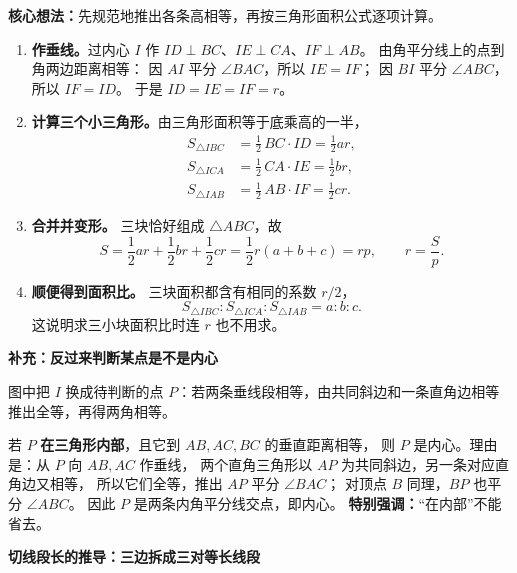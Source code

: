 \begin{proofbox}
\begin{minipage}{\linewidth}
\end{minipage}\par
\textbf{核心想法：}先规范地推出各条高相等，再按三角形面积公式逐项计算。
\begin{enumerate}[leftmargin=*,itemsep=0.65em]
 \item \textbf{作垂线。}过内心 $I$ 作
 $ID\perp BC$、$IE\perp CA$、$IF\perp AB$。
 由角平分线上的点到角两边距离相等：
 因 $AI$ 平分 $\angle BAC$，所以 $IE=IF$；
 因 $BI$ 平分 $\angle ABC$，所以 $IF=ID$。
 于是 $ID=IE=IF=r$。
 \item \textbf{计算三个小三角形。}由三角形面积等于底乘高的一半，
 \[
 \begin{aligned}
 S_{\triangle IBC}&=\frac12\,BC\cdot ID=\frac12ar,\\
 S_{\triangle ICA}&=\frac12\,CA\cdot IE=\frac12br,\\
 S_{\triangle IAB}&=\frac12\,AB\cdot IF=\frac12cr.
 \end{aligned}
 \]
 \item \textbf{合并并变形。}
 三块恰好组成 $\triangle ABC$，故
 \[
  S=\frac12ar+\frac12br+\frac12cr
   =\frac12r(a+b+c)=rp,
  \qquad \boxed{r=\frac Sp}.
 \]
 \item \textbf{顺便得到面积比。}
 三块面积都含有相同的系数 $r/2$，
 \[
   \boxed{S_{\triangle IBC}:S_{\triangle ICA}:S_{\triangle IAB}=a:b:c}.
 \]
 这说明求三小块面积比时连 $r$ 也不用求。
\end{enumerate}

\medskip
\par\noindent\begin{minipage}{\linewidth}
\textbf{\textcolor{CProof}{补充：反过来判断某点是不是内心}}

\PAngleFigure
\end{minipage}\par
图中把 $I$ 换成待判断的点 $P$：若两条垂线段相等，由共同斜边和一条直角边相等推出全等，再得两角相等。

若 $P$ \textbf{在三角形内部}，且它到 $AB,AC,BC$ 的垂直距离相等，
则 $P$ 是内心。理由是：从 $P$ 向 $AB,AC$ 作垂线，
两个直角三角形以 $AP$ 为共同斜边，另一条对应直角边又相等，
所以它们全等，推出 $AP$ 平分 $\angle BAC$；
对顶点 $B$ 同理，$BP$ 也平分 $\angle ABC$。
因此 $P$ 是两条内角平分线交点，即内心。
\textbf{特别强调：}“在内部”不能省去。

\medskip
\par\noindent\begin{minipage}{\linewidth}
\textbf{\textcolor{CProof}{切线段长的推导：三边拆成三对等长线段}}


\end{minipage}
\end{proofbox}
